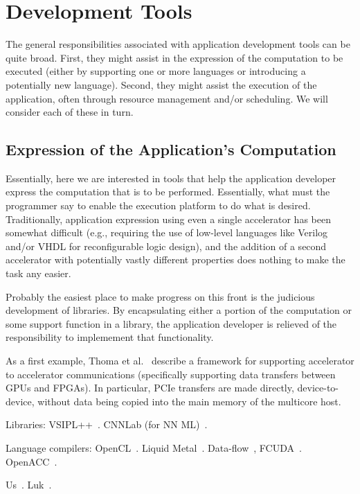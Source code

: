 \section{Development Tools}
\label{sec:dev}

The general responsibilities associated with application development
tools can be quite broad.  First, they might assist in the expression of
the computation to be executed (either by supporting one or more languages
or introducing a potentially new language).  Second, they might assist the
execution of the application, often through resource management and/or
scheduling.  We will consider each of these in turn.

\subsection{Expression of the Application's Computation}

Essentially, here we are interested in tools that help the application
developer express the computation that is to be performed. Essentially, what
must the programmer say to enable the execution platform to do what is
desired.  Traditionally, application expression using even a single
accelerator has been somewhat difficult (e.g., requiring the use of
low-level languages like Verilog and/or VHDL for reconfigurable logic
design), and the addition of a second accelerator with potentially vastly
different properties does nothing to make the task any easier.

Probably the easiest place to make progress on this front is the judicious
development of libraries.  By encapsulating either a portion of the
computation or some support function in a library, the application
developer is relieved of the responsibility to implemement that functionality.

As a first example, Thoma et al.~\cite{tdmp15} describe a framework for
supporting accelerator to accelerator communications (specifically supporting
data transfers between GPUs and FPGAs).  In particular, PCIe transfers
are made directly, device-to-device, without data being copied into
the main memory of the multicore host. 


Libraries:
VSIPL++~\cite{mlk12}.
CNNLab (for NN ML)~\cite{zlwx16}.

Language compilers:
OpenCL~\cite{Ahmed11}.
Liquid Metal~\cite{abb+12}.
Data-flow~\cite{szb+12},
FCUDA~\cite{pgs+13}.
OpenACC~\cite{lkv16}.

Us~\cite{blc17,cft+10,ctg+07,ftb+06,wcc12,wcc13}.
Luk~\cite{ttpl10}.

